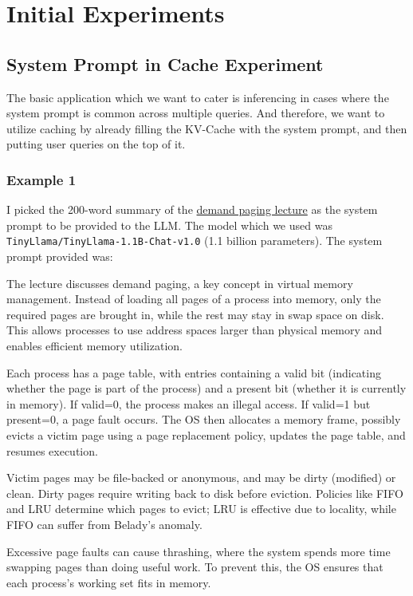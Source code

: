 \chapter{Initial Experiments}
\label{ch:initial_experiments}
\section{System Prompt in Cache Experiment}

The basic application which we want to cater is inferencing in cases where the system prompt is common across multiple queries. And therefore, we want to utilize caching by already filling the KV-Cache with the system prompt, and then putting user queries on the top of it.


\subsection{Example 1}
I picked the 200-word summary of the \href{https://www.cse.iitb.ac.in/~mythili/os/iitb_slides/demand-paging.pdf}{demand paging lecture} as the system prompt to be provided to the LLM. The model which we used was \texttt{TinyLlama/TinyLlama-1.1B-Chat-v1.0} (1.1 billion parameters). The system prompt provided was:

\begin{tcolorbox}[colback=gray!10, colframe=gray!60!black, sharp corners, boxrule=0.5pt, left=4pt, right=4pt, top=4pt, bottom=4pt]
\small
The lecture discusses demand paging, a key concept in virtual memory management. Instead of loading all pages of a process into memory, only the required pages are brought in, while the rest may stay in swap space on disk. This allows processes to use address spaces larger than physical memory and enables efficient memory utilization.

Each process has a page table, with entries containing a valid bit (indicating whether the page is part of the process) and a present bit (whether it is currently in memory). If valid=0, the process makes an illegal access. If valid=1 but present=0, a page fault occurs. The OS then allocates a memory frame, possibly evicts a victim page using a page replacement policy, updates the page table, and resumes execution.

Victim pages may be file-backed or anonymous, and may be dirty (modified) or clean. Dirty pages require writing back to disk before eviction. Policies like FIFO and LRU determine which pages to evict; LRU is effective due to locality, while FIFO can suffer from Belady’s anomaly.

Excessive page faults can cause thrashing, where the system spends more time swapping pages than doing useful work. To prevent this, the OS ensures that each process’s working set fits in memory.
\end{tcolorbox}


